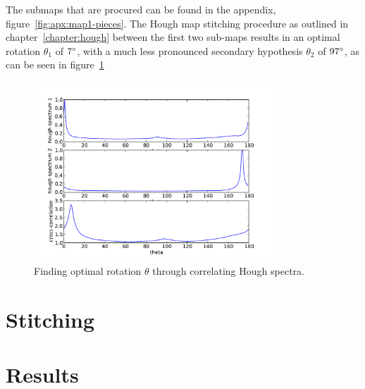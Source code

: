 The submaps that are procured can be found in the appendix, figure~\ref{fig:apx:map1-pieces}. The Hough map stitching procedure as outlined in chapter~\ref{chapter:hough} between the first two sub-maps results in an optimal rotation $\theta_1$ of $7\degree$, with a much less pronounced secondary hypothesis $\theta_2$ of $97\degree$, as can be seen in figure~\ref{fig:exp:1:theta}


\begin{figure}[ht]
  \centering
  \includegraphics[width=0.8\textwidth]{images/experiment/map1/stitch1-theta-correlation-result.pdf}
  
  \caption{Finding optimal rotation $\theta$ through correlating Hough spectra.}
  \label{fig:exp:1:theta}
\end{figure}



\section{Stitching}

\section{Results}